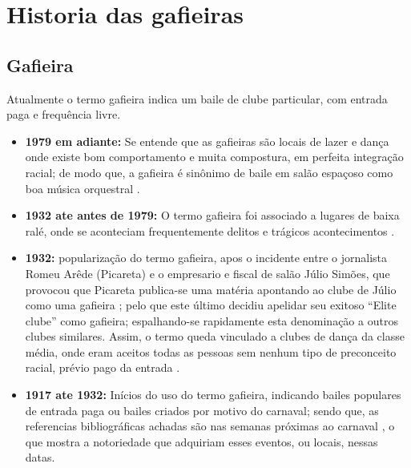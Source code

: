 

\chapter{Historia das gafieiras}

\section{Gafieira}
\label{def:Gafieira}
Atualmente o termo gafieira indica um baile de clube particular, com entrada paga e frequência livre. 

\begin{itemize}
\item \textbf{1979 em adiante:} Se entende que as gafieiras são locais de lazer 
e dança onde existe bom comportamento e muita compostura,
em perfeita integração racial; de modo que, 
a gafieira é sinônimo de baile em salão espaçoso como boa música orquestral \cite[pp. 10-11]{respeitojournalbrasil1}.

\item \textbf{1932 ate antes de 1979:} O termo gafieira foi associado a lugares de baixa ralé, onde 
se aconteciam frequentemente delitos e trágicos acontecimentos \cite[pp. 11]{gafieirajournalbrasil1} \cite[pp. 12]{gafieirajournaloradical1} \cite[pp. 10-11]{respeitojournalbrasil1}.

\item \textbf{1932:} popularização do termo gafieira, apos o
incidente entre o jornalista Romeu Arêde (Picareta) e o empresario e fiscal de salão Júlio Simões,
que provocou que  Picareta publica-se uma matéria apontando 
ao clube de Júlio como uma gafieira \cite[pp. 3 - cad. 3]{juliosimoes} 
\cite[pp. 21]{efege1974maxixe} \cite[pp. 78]{coutinho2006cronistas};
pelo que este último decidiu apelidar seu exitoso ``Elite clube'' como gafieira;
espalhando-se rapidamente esta denominação a outros clubes similares. 
Assim, o termo queda vinculado a clubes de dança da classe média,
onde eram aceitos todas as pessoas sem nenhum tipo de preconceito racial, 
prévio pago da entrada \cite[pp. 6 - cad. B]{entrevistajuliojournalbrasil1}.


\item \textbf{1917 ate 1932:} 
Inícios do uso do termo gafieira, indicando bailes populares \cite[pp. 29]{instituto1987revista} de entrada paga
ou bailes criados por motivo do carnaval; sendo que, as referencias bibliográficas
achadas são nas semanas próximas ao carnaval \cite[pp. 4]{oldgafieira1} 
\cite[pp. 7]{oldgafieira2} \cite[pp. 4]{oldgafieira3} \cite[pp. 5]{oldgafieira4},
o que mostra a notoriedade que adquiriam esses eventos, ou locais, nessas datas.
\end{itemize}

